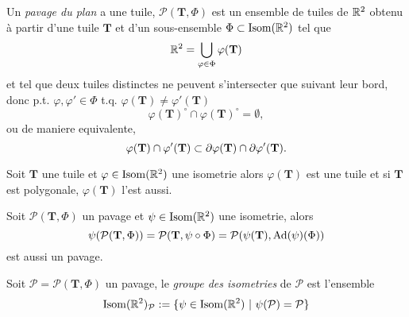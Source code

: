\begin{definition}
	Un \emph{pavage du plan} a une tuile, $\mathcal{P}(\mathbf{T}, \Phi)$ est un
	ensemble de tuiles de $\mathbb{R}^2$ obtenu à partir d'une tuile $\mathbf{T}$
	et d'un sous-ensemble $\Phi \subset \operatorname{Isom}(\mathbb{R}^2)$ tel que
	\begin{equation*}
		\mathbb{R}^2 = \bigcup_{\varphi \in \Phi} \varphi(\mathbf{T})
	\end{equation*}
	et tel que deux tuiles distinctes ne peuvent s'intersecter que suivant leur
	bord, donc p.t. $\varphi, \varphi' \in \Phi$ 
	t.q. $\varphi(\mathbf{T}) \neq \varphi'(\mathbf{T})$
	\begin{equation*}
		\varphi(\mathbf{T})^\circ \cap \varphi(\mathbf{T})^\circ = \emptyset,
	\end{equation*}
	ou de maniere equivalente,
	\begin{equation*}
		\varphi(\mathbf{T}) \cap \varphi'(\mathbf{T}) \subset
		\partial \varphi(\mathbf{T}) \cap \partial \varphi'(\mathbf{T}).
	\end{equation*}	
\end{definition}

\begin{proposition}
	Soit $\mathbf{T}$ une tuile et $\varphi \in \operatorname{Isom}(\mathbb{R}^2)$ une isometrie alors
	$\varphi(\mathbf{T})$ est une tuile et si $\mathbf{T}$ est polygonale,
	$\varphi(\mathbf{T})$ l'est aussi.
\end{proposition}

\begin{proposition}
	Soit $\mathcal{P}(\mathbf{T}, \Phi)$ un pavage et $\psi \in \operatorname{Isom}(\mathbb{R}^2)$ une
	isometrie, alors 
	\begin{equation*}
		\psi(\mathcal{P}(\mathbf{T}, \Phi)) = \mathcal{P}(\mathbf{T}, \psi \circ \Phi)
		= \mathcal{P}(\psi(\mathbf{T}), \operatorname{Ad}(\psi)(\Phi))
	\end{equation*}
	est aussi un pavage.
\end{proposition}

\begin{definition}
	Soit $\mathcal{P} = \mathcal{P}(\mathbf{T}, \Phi)$ un pavage, le \emph{groupe
	des isometries} de $\mathcal{P}$ est l'ensemble
	\begin{equation*}
		\operatorname{Isom}(\mathbb{R}^2)_\mathcal{P} := 
		\{\psi \in \operatorname{Isom}(\mathbb{R}^2)\ |\ \psi(\mathcal{P}) = \mathcal{P}\}
	\end{equation*}
\end{definition}

